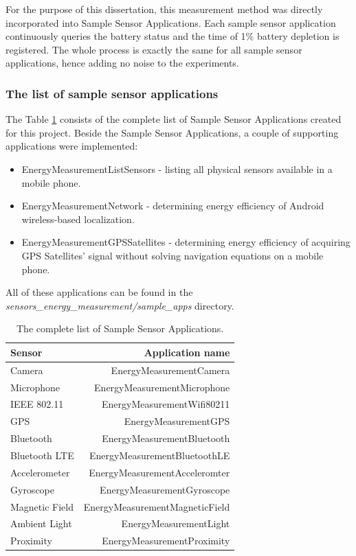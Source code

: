 For the purpose of this dissertation, this measurement method was directly incorporated into Sample Sensor Applications. Each sample sensor application continuously queries the battery status and the time of 1\% battery depletion is registered. The whole process is exactly the same for all sample sensor applications, hence adding no noise to the experiments.

\subsubsection{The list of sample sensor applications}	
\label{s:design:measurements:applications}
\hspace{10pt} The Table \ref{table:samplesensorapps} consists of the complete list of Sample Sensor Applications created for this project. Beside the Sample Sensor Applications, a couple of supporting applications were implemented:
\begin{itemize}
	\item EnergyMeasurementListSensors - listing all physical sensors available in a mobile phone.
	\item EnergyMeasurementNetwork - determining energy efficiency of Android wireless-based localization.
	\item EnergyMeasurementGPSSatellites - determining energy efficiency of acquiring GPS Satellites' signal without solving navigation equations on a mobile phone.	
\end{itemize}
All of these applications can be found in the \textit{sensors\_energy\_measurement/sample\_apps} directory.
		
\begin{table}[H]
	\centering
    \begin{tabular}{| l | r | }
    \hline
    \textbf{Sensor} & \textbf{Application name} \\ \hline
    Camera & EnergyMeasurementCamera \\ \hline
    Microphone & EnergyMeasurementMicrophone \\\hline
    IEEE 802.11 & EnergyMeasurementWifi80211 \\ \hline
    GPS & EnergyMeasurementGPS \\ \hline
    Bluetooth & EnergyMeasurementBluetooth \\ \hline
    Bluetooth LTE & EnergyMeasurementBluetoothLE \\ \hline
    Accelerometer & EnergyMeasurementAcceleromter \\ \hline
    Gyroscope & EnergyMeasurementGyroscope \\ \hline
    Magnetic Field & EnergyMeasurementMagneticField\\ \hline
    Ambient Light & EnergyMeasurementLight \\ \hline
    Proximity & EnergyMeasurementProximity \\ \hline
    \end{tabular}
    \caption{The complete list of Sample Sensor Applications.}
	\label{table:samplesensorapps}
\end{table}			


